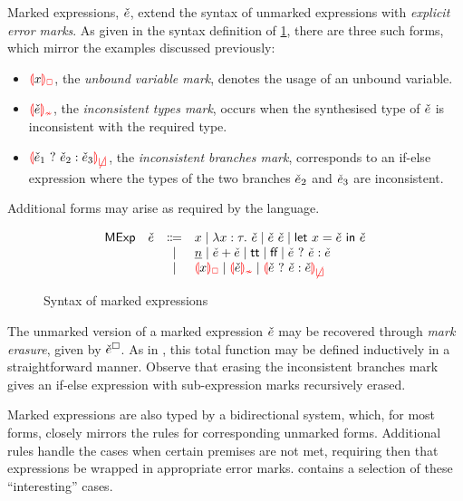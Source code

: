 Marked expressions, $\check{e}$, extend the syntax of unmarked expressions with \emph{explicit error
marks}. As given in the syntax definition of \cref{fig:calculus-syntax-mexp}, there are three such
forms, which mirror the examples discussed previously:
%
\begin{itemize} %
  \item $\ECUnbound{x}$, the \emph{unbound variable mark}, denotes the usage of an unbound variable.

  \item $\ECInconType{\ECMV}$, the \emph{inconsistent types mark}, occurs when the synthesised type
    of $\check{e}$ is inconsistent with the required type.

  \item $\ECInconBr{\ECMV_1}{\ECMV_2}{\ECMV_3}$, the \emph{inconsistent branches mark}, corresponds
    to an if-else expression where the types of the two branches $\check{e}_2$ and $\check{e}_3$ are
    inconsistent.
\end{itemize}
%
Additional forms may arise as required by the language.


\begin{figure}[htbp]
  \[\begin{array}{rrcl}
    \ECMName & \ECMV & \Coloneqq & x \mid \ECLam{x}{\TMV}{\ECMV} \mid \ECAp{\ECMV}{\ECMV} \mid \ECLet{x}{\ECMV}{\ECMV} \\
             &       & \mid         & \ECNumMV \mid \ECPlus{\ECMV}{\ECMV}
                       \mid           \ECTrue \mid \ECFalse \mid \ECIf{\ECMV}{\ECMV}{\ECMV} \\
             &       & \mid         & \ECUnbound{x} \mid \ECInconType{\ECMV} \mid \ECInconBr{\ECMV}{\ECMV}{\ECMV}
  \end{array}\]
  \caption{Syntax of marked expressions}
  \label{fig:calculus-syntax-mexp}
\end{figure}

The unmarked version of a marked expression $\check{e}$ may be recovered through \emph{mark erasure},
given by $\check{e}^{\square}$. As in , this total function may be defined
inductively in a straightforward manner. Observe that erasing the inconsistent branches mark gives
an if-else expression with sub-expression marks recursively erased.



Marked expressions are also typed by a bidirectional system, which, for most forms, closely mirrors
the rules for corresponding unmarked forms. Additional rules handle the cases when certain premises
are not met, requiring then that expressions be wrapped in appropriate error marks.
 contains a selection of these ``interesting'' cases.

